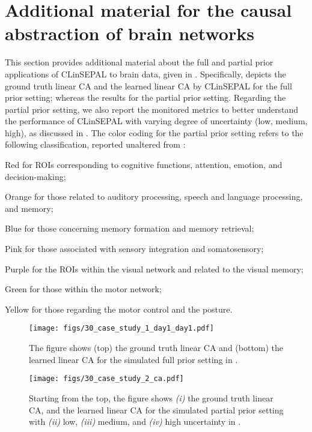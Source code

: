 \section{Additional material for the causal abstraction of brain networks}\label{app:rw_figs}

This section provides additional material about the full and partial prior applications of CLinSEPAL to brain data, given in .
Specifically,  depicts the ground truth linear CA and the learned linear CA by CLinSEPAL for the full prior setting; whereas  the results for the partial prior setting.
Regarding the partial prior setting, we also report the monitored metrics to better understand the performance of CLinSEPAL with varying degree of uncertainty (low, medium, high), as discussed in .
The color coding for the partial prior setting refers to the following classification, reported unaltered from :
\begin{squishlist}
    \item Red for ROIs corresponding to cognitive functions, attention, emotion, and decision-making;
    \item Orange for those related to auditory processing, speech and language processing, and memory;
    \item Blue for those concerning memory formation and memory retrieval;
    \item Pink for those associated with sensory integration and somatosensory;
    \item Purple for the ROIs within the visual network and related to the visual memory;
    \item Green for those within the motor network;
    \item Yellow for those regarding the motor control and the posture.
\end{squishlist}

\begin{figure}
    \centering
    \texttt{[image: figs/30\_case\_study\_1\_day1\_day1.pdf]}
    \caption{The figure shows (top) the ground truth linear CA and (bottom) the learned linear CA for the simulated full prior setting in .}
    \label{fig:ROIsLobes}
\end{figure}



\begin{figure}
    \centering
    \texttt{[image: figs/30\_case\_study\_2\_ca.pdf]}
    \caption{Starting from the top, the figure shows \emph{(i)} the ground truth linear CA, and the learned linear CA for the simulated partial prior setting with \emph{(ii)} low, \emph{(iii)} medium, and \emph{(iv)} high uncertainty in .}
    \label{fig:ROIsFun_ca}
\end{figure}

